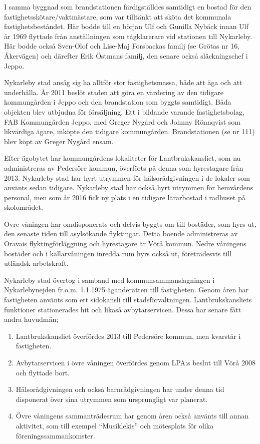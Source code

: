 I samma byggnad som brandstationen färdigställdes samtidigt en bostad för den fastighetsskötare/vaktmästare, som var tilltänkt att sköta det kommunala fastighetsbeståndet. Här bodde till en början Ulf och Gunilla Nybäck innan Ulf år 1969 flyttade från anställningen som tågklarerare vid stationen till Nykarleby. Här bodde också Sven-Olof och Lise-Maj Forsbackas familj (se Grötas nr 16, Åkervägen) och därefter Erik Östmans familj, den senare också släckningschef i Jeppo.






Nykarleby stad ansåg sig ha alltför stor fastighetsmassa, både att äga och att underhålla. År 2011 beslöt staden att göra en värdering av den tidigare kommungården i Jeppo och den brandstation som  byggts samtidigt. Båda objekten blev utbjudna för försäljning. Ett i bildande varande fastighetsbolag, FAB Kommungården Jeppo, med Greger Nygård och Johnny Rönnqvist som likvärdiga ägare, inköpte den tidigare kommungården. Brandstationen (se nr 111) blev köpt av Greger Nygård ensam.

Efter ägobytet har kommungårdens lokaliteter för Lantbrukskansliet, som nu administreras av Pedersöre kommun, överförts på denna som hyrestagare från 2013. Nykarleby stad har  hyrt utrymmen för hälsorådgivningen i de lokaler som använts sedan tidigare. Nykarleby stad har också hyrt utrymmen för hemvårdens personal, men som år 2016 fick ny plats i en tidigare lärarbostad i radhuset på skolområdet.

Övre våningen har omdisponerats och delvis byggts om till bostäder, som hyrs ut, den senaste tiden till asylsökande flyktingar. Detta boende administreras av Oravais flyktingförläggning och hyrestagare är Vörå kommun. Nedre våningens bostäder och i källarvåningen inredda rum hyrs också ut, företrädesvis till utländsk arbetskraft.


Nykarleby stad övertog i samband med kommunsammanslagningen i Nykarlebynejden fr.o.m. 1.1.1975 äganderätten till fastigheten. Genom åren har fastigheten använts som ett sidokansli till stadsförvaltningen. Lantbrukskansliets funktioner stationerades hit och likaså avbytarservicen. Dessa har senare fått andra huvudmän;
\begin{enumerate}
  \item Lantbrukskansliet överfördes 2013 till Pedersöre kommun, men kvarstår i fastigheten.
  \item Avbytarservicen i övre  våningen överfördes genom LPA:s beslut till Vörå 2008 och flyttade bort.
  \item Hälsorådgivningen och också barnrådgivningen har under denna tid disponerat över sina utrymmen som ursprungligt var planerat.
  \item Övre våningens sammanträdesrum har genom åren också använts till annan aktivitet, som till exempel ``Musiklekis'' och mötesplats för olika föreningssammankomster.
\end{enumerate}


